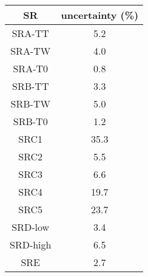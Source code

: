 \begin{tabular}{c||c} \hline\hline
{\bf SR} & {\bf uncertainty (\%)} \\ \hline
SRA-TT & 5.2\\ \hline
SRA-TW & 4.0\\ \hline
SRA-T0 & 0.8\\ \hline
SRB-TT & 3.3\\ \hline
SRB-TW & 5.0\\ \hline
SRB-T0 & 1.2\\ \hline
SRC1   & 35.3\\ \hline
SRC2   & 5.5\\ \hline
SRC3   & 6.6\\ \hline
SRC4   & 19.7\\ \hline
SRC5   & 23.7\\ \hline
SRD-low & 3.4\\ \hline
SRD-high & 6.5\\ \hline
SRE & 2.7\\ \hline
\hline
\end{tabular}
